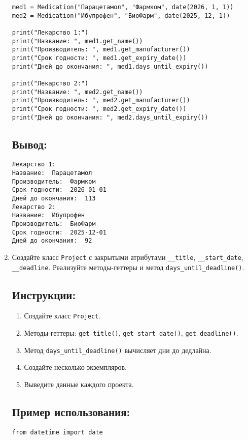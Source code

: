 \begin{enumerate}
\begin{lstlisting}[caption=Пример кода]
med1 = Medication("Парацетамол", "Фармком", date(2026, 1, 1))
med2 = Medication("Ибупрофен", "БиоФарм", date(2025, 12, 1))

print("Лекарство 1:")
print("Название: ", med1.get_name())
print("Производитель: ", med1.get_manufacturer())
print("Срок годности: ", med1.get_expiry_date())
print("Дней до окончания: ", med1.days_until_expiry())

print("Лекарство 2:")
print("Название: ", med2.get_name())
print("Производитель: ", med2.get_manufacturer())
print("Срок годности: ", med2.get_expiry_date())
print("Дней до окончания: ", med2.days_until_expiry())
\end{lstlisting}

\subsection*{Вывод:}
\begin{lstlisting}[caption=Ожидаемый вывод]
Лекарство 1:
Название:  Парацетамол
Производитель:  Фармком
Срок годности:  2026-01-01
Дней до окончания:  113
Лекарство 2:
Название:  Ибупрофен
Производитель:  БиоФарм
Срок годности:  2025-12-01
Дней до окончания:  92
\end{lstlisting}

\item
Создайте класс \texttt{Project} с закрытыми атрибутами \texttt{\_\_title}, \texttt{\_\_start\_date}, \texttt{\_\_deadline}. Реализуйте методы-геттеры и метод \texttt{days\_until\_deadline()}.

\subsection*{Инструкции:}
\begin{enumerate}
    \item Создайте класс \texttt{Project}.
    \item Методы-геттеры: \texttt{get\_title()}, \texttt{get\_start\_date()}, \texttt{get\_deadline()}.
    \item Метод \texttt{days\_until\_deadline()} вычисляет дни до дедлайна.
    \item Создайте несколько экземпляров.
    \item Выведите данные каждого проекта.
\end{enumerate}

\subsection*{Пример использования:}
\begin{lstlisting}[caption=Пример кода]
from datetime import date


\end{lstlisting}
\end{enumerate}
